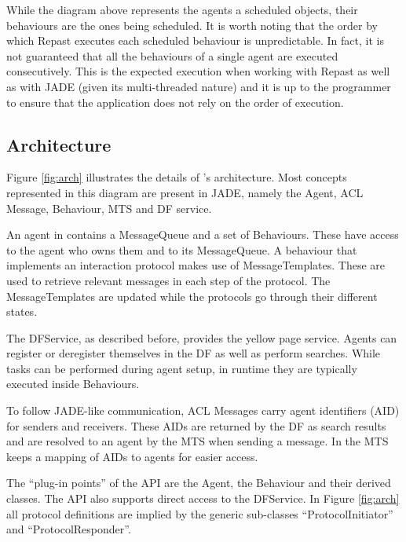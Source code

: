 While the diagram above represents the agents a scheduled objects, their behaviours are the ones being scheduled. It is worth noting that the order by which Repast executes each scheduled behaviour is unpredictable. In fact, it is not guaranteed that all the behaviours of a single agent are executed consecutively. This is the expected execution when working with Repast as well as with JADE (given its multi-threaded nature) and it is up to the programmer to ensure that the application does not rely on the order of execution.

\subsection{Architecture}

Figure \ref{fig:arch} illustrates the details of \apiname{}'s architecture. Most concepts represented in this diagram are present in JADE, namely the Agent, ACL Message, Behaviour, MTS and DF service.

An agent in \apiname{} contains a MessageQueue and a set of Behaviours. These have access to the agent who owns them and to its MessageQueue. A behaviour that implements an interaction protocol makes use of MessageTemplates. These are used to retrieve relevant messages in each step of the protocol. The MessageTemplates are updated while the protocols go through their different states.

The DFService, as described before, provides the yellow page service. Agents can register or deregister themselves in the DF as well as perform searches. While tasks can be performed during agent setup, in runtime they are typically executed inside Behaviours.

To follow JADE-like communication, ACL Messages carry agent identifiers (AID) for senders and receivers. These AIDs are returned by the DF as search results and are resolved to an agent by the MTS when sending a message. In \apiname{} the MTS keeps a mapping of AIDs to agents for easier access.

The ``plug-in points'' of the API are the Agent, the Behaviour and their derived classes. The API also supports direct access to the DFService. In Figure \ref{fig:arch} all protocol definitions are implied by the generic sub-classes ``ProtocolInitiator'' and ``ProtocolResponder''. 

